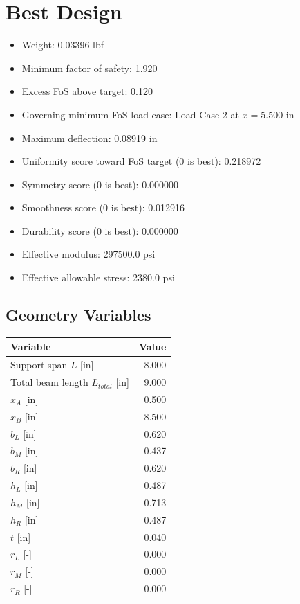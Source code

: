 \documentclass[11pt]{article}
\begin{document}
\section*{Best Design}
\begin{itemize}
\item Weight: 0.03396 lbf
\item Minimum factor of safety: 1.920
\item Excess FoS above target: 0.120
\item Governing minimum-FoS load case: Load Case 2 at $x=5.500$ in
\item Maximum deflection: 0.08919 in
\item Uniformity score toward FoS target (0 is best): 0.218972
\item Symmetry score (0 is best): 0.000000
\item Smoothness score (0 is best): 0.012916
\item Durability score (0 is best): 0.000000
\item Effective modulus: 297500.0 psi
\item Effective allowable stress: 2380.0 psi
\end{itemize}

\subsection*{Geometry Variables}
\begin{center}
\begin{tabular}{lr}
\toprule
Variable & Value \\
\midrule
Support span $L$ [in] & 8.000 \\
Total beam length $L_{total}$ [in] & 9.000 \\
$x_A$ [in] & 0.500 \\
$x_B$ [in] & 8.500 \\
$b_L$ [in] & 0.620 \\
$b_M$ [in] & 0.437 \\
$b_R$ [in] & 0.620 \\
$h_L$ [in] & 0.487 \\
$h_M$ [in] & 0.713 \\
$h_R$ [in] & 0.487 \\
$t$ [in] & 0.040 \\
$r_L$ [-] & 0.000 \\
$r_M$ [-] & 0.000 \\
$r_R$ [-] & 0.000 \\
\bottomrule
\end{tabular}
\end{center}
\end{document}
